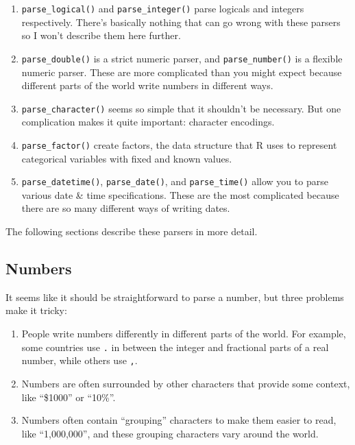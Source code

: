 \documentclass[]{book}
\begin{document}
\begin{enumerate}
\def\labelenumi{\arabic{enumi}.}
\item
  \texttt{parse\_logical()} and \texttt{parse\_integer()} parse logicals
  and integers respectively. There's basically nothing that can go wrong
  with these parsers so I won't describe them here further.
\item
  \texttt{parse\_double()} is a strict numeric parser, and
  \texttt{parse\_number()} is a flexible numeric parser. These are more
  complicated than you might expect because different parts of the world
  write numbers in different ways.
\item
  \texttt{parse\_character()} seems so simple that it shouldn't be
  necessary. But one complication makes it quite important: character
  encodings.
\item
  \texttt{parse\_factor()} create factors, the data structure that R
  uses to represent categorical variables with fixed and known values.
\item
  \texttt{parse\_datetime()}, \texttt{parse\_date()}, and
  \texttt{parse\_time()} allow you to parse various date \& time
  specifications. These are the most complicated because there are so
  many different ways of writing dates.
\end{enumerate}

The following sections describe these parsers in more detail.

\subsection{Numbers}\label{numbers}

It seems like it should be straightforward to parse a number, but three
problems make it tricky:

\begin{enumerate}
\def\labelenumi{\arabic{enumi}.}
\item
  People write numbers differently in different parts of the world. For
  example, some countries use \texttt{.} in between the integer and
  fractional parts of a real number, while others use \texttt{,}.
\item
  Numbers are often surrounded by other characters that provide some
  context, like ``\$1000'' or ``10\%''.
\item
  Numbers often contain ``grouping'' characters to make them easier to
  read, like ``1,000,000'', and these grouping characters vary around
  the world.
\end{enumerate}
\end{document}

